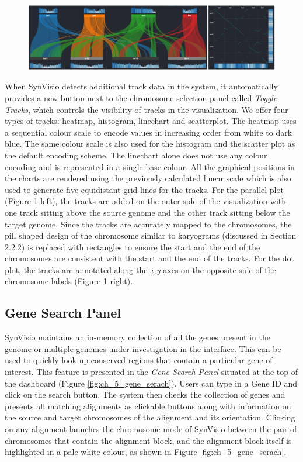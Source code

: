 \begin{figure}
  \centering
  \includegraphics[width=1\linewidth]{images/ch_5_tracks.PNG}
  \label{fig:ch_5_tracks}
\end{figure}
When SynVisio detects additional track data in the system, it automatically provides a new button next to the chromosome selection panel called \textit{Toggle Tracks}, which controls the visibility of tracks in the visualization. We offer four types of tracks: heatmap, histogram, linechart and scatterplot. The heatmap uses a sequential colour scale to encode values in increasing order from white to dark blue. The same colour scale is also used for the histogram and the scatter plot as the default encoding scheme. The linechart alone does not use any colour encoding and is represented in a single base colour. All the graphical positions in the charts are rendered using the previously calculated linear scale which is also used to generate five equidistant grid lines for the tracks. For the parallel plot (Figure \ref{fig:ch_5_tracks} left), the tracks are added on the outer side of the visualization with one track sitting above the source genome and the other track sitting below the target genome. Since the tracks are accurately mapped to the chromosomes, the pill shaped design of the chromosome similar to karyograms (discussed in Section 2.2.2) is replaced with rectangles to ensure the start and the end of the chromosomes are consistent with the start and the end of the tracks. For the dot plot, the tracks are annotated along the \textit{x,y} axes on the opposite side of the chromosome labels (Figure \ref{fig:ch_5_tracks} right).


\subsection{Gene Search Panel}
SynVisio maintains an in-memory collection of all the genes present in the genome or multiple genomes under investigation in the interface. This can be used to quickly look up conserved regions that contain a particular gene of interest. This feature is presented in the \textit{Gene Search Panel} situated at the top of the dashboard (Figure \ref{fig:ch_5_gene_serach}). Users can type in a Gene ID and click on the search button. The system then checks the collection of genes and presents all matching alignments as clickable buttons along with information on the source and target chromosomes of the alignment and its orientation. Clicking on any alignment launches the chromosome mode of SynVisio between the pair of chromosomes that contain the alignment block, and the alignment block itself is highlighted in a pale white colour, as shown in Figure \ref{fig:ch_5_gene_serach}. 

